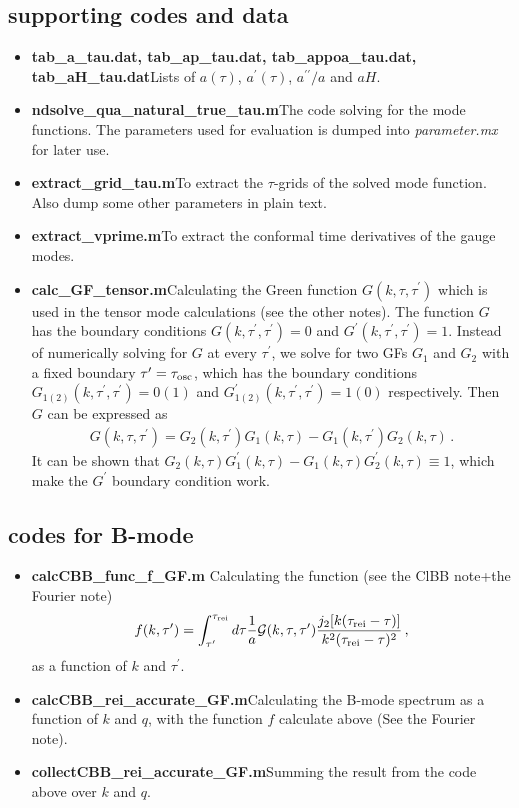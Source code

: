 \documentclass[12pt]{article}
\newcommand{\mc}{\mathcal}
\begin{document}
\subsection*{supporting codes and data}
\begin{itemize}\itemsep0em
\item {\bf tab\_a\_tau.dat, tab\_ap\_tau.dat, tab\_appoa\_tau.dat, tab\_aH\_tau.dat}\quad Lists of $a(\tau)$, $a^\prime(\tau)$, $a^{\prime\prime}/a$ and $aH$.
\item {\bf ndsolve\_qua\_natural\_true\_tau.m}\quad The code solving for the mode functions. The parameters used for evaluation is dumped into {\it parameter.mx} for later use.
\item {\bf extract\_grid\_tau.m}\quad To extract the $\tau$-grids of the solved mode function. Also dump some other parameters in plain text.
\item {\bf extract\_vprime.m}\quad To extract the conformal time derivatives of the gauge modes.
\item {\bf calc\_GF\_tensor.m}\quad Calculating the Green function $G(k,\tau,\tau^\prime)$ which is used in the tensor mode calculations (see the other notes). The function $G$ has the boundary conditions $G(k,\tau^\prime,\tau^\prime)=0$ and $G^\prime(k,\tau^\prime,\tau^\prime)=1$. Instead of numerically solving for $G$ at every $\tau^\prime$, we solve for two GFs $G_1$ and $G_2$ with a fixed boundary $\tau^\prime=\tau_{\rm osc}$, which has the boundary conditions $G_{1(2)}(k,\tau^\prime,\tau^\prime)=0(1)$ and $G_{1(2)}^\prime(k,\tau^\prime,\tau^\prime)=1(0)$ respectively. Then $G$ can be expressed as
\begin{align}
G(k,\tau,\tau^\prime)=G_2(k,\tau^\prime)G_1(k,\tau)-G_1(k,\tau^\prime)G_2(k,\tau)\,. 
\end{align}
It can be shown that $G_2(k,\tau)G^\prime_1(k,\tau)-G_1(k,\tau)G^\prime_2(k,\tau)\equiv 1$, which make the $G^\prime$ boundary condition work.
\end{itemize}

\subsection*{codes for B-mode}
\begin{itemize}\itemsep0em
\item {\bf calcCBB\_func\_f\_GF.m} \quad Calculating the function (see the ClBB note+the Fourier note)
\begin{align}
f(k,\tau^\prime)=\int^{\tau_{\rm rei}}_{\tau^\prime}d\tau\dfrac{1}{a}\mc{G}(k,\tau,\tau^\prime)\dfrac{j_2[k(\tau_{\rm rei}-\tau)]}{k^2(\tau_{\rm rei}-\tau)^2}\,,
\end{align}
as a function of $k$ and $\tau^\prime$.
\item {\bf calcCBB\_rei\_accurate\_GF.m}\quad Calculating the B-mode spectrum as a function of $k$ and $q$, with the function $f$ calculate above (See the Fourier note).
\item {\bf collectCBB\_rei\_accurate\_GF.m}\quad Summing the result from the code above over $k$ and $q$.
\end{itemize}
\end{document}

